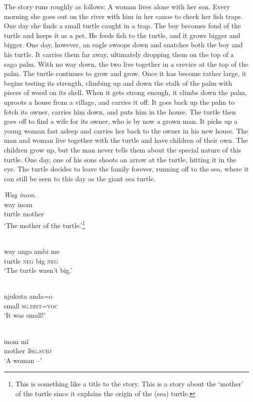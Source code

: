   The story runs roughly as follows: A woman lives alone with her son. Every morning she goes out on the river with him in her canoe to check her fish traps. One day she finds a small turtle caught in a trap. The boy becomes fond of the turtle and keeps it as a pet. He feeds fish to the turtle, and it grows bigger and bigger. One day, however, an eagle swoops down and snatches both the boy and his turtle. It carries them far away, ultimately dropping them on the top of a sago palm. With no way down, the two live together in a crevice at the top of the palm. The turtle continues to grow and grow. Once it has become rather large, it begins testing its strength, climbing up and down the stalk of the palm with pieces of wood on its shell. When it gets strong enough, it climbs down the palm, uproots a house from a village, and carries it off. It goes back up the palm to fetch its owner, carries him down, and puts him in the house. The turtle then goes off to find a wife for its owner, who is by now a grown man. It picks up a young woman fast asleep and carries her back to the owner in his new house. The man and woman live together with the turtle and have children of their own. The children grow up, but the man never tells them about the special nature of this turtle. One day, one of his sons shoots an arrow at the turtle, hitting it in the eye. The turtle decides to leave the family forever, running off to the sea, where it can still be seen to this day as the giant sea turtle.

\ea
{\itshape Way inom.}\\
\gll way  inom\\
turtle  mother\\
\glt ‘The mother of the turtle.’\footnote{This is something like a title to the story. This is a story about the ‘mother’ of the turtle since it explains the origin of the (sea) turtle.}

\\
\gll way  ango  ambi  me\\
turtle  \textsc{neg}  big    \textsc{neg}\\
\glt ‘The turtle wasn’t big.’

\\
\gll njukuta  anda{{}=o}\\
small    \textsc{sg.dist=voc}\\
\glt ‘It was small!’

\\
\gll inom  mï\\
mother  3\textsc{sg.subj}\\
\glt ‘A woman --’

